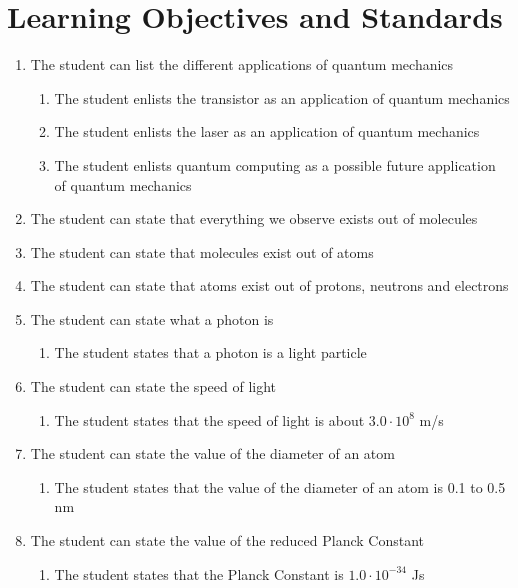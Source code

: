 \documentclass[11pt,twoside]{report} %
\begin{document}
\newpage

\chapter{Learning Objectives and Standards}
\label{app:objectivestandards}

\begin{enumerate}
\item The student can list the different applications of quantum mechanics
\begin{enumerate}
\item The student enlists the transistor as an application of quantum mechanics
\item The student enlists the laser as an application of quantum mechanics
\item The student enlists quantum computing as a possible future application of quantum mechanics
\end{enumerate}
\item \label{itm:molecules} The student can state that everything we observe exists out of molecules
\item The student can state that molecules exist out of atoms
\item The student can state that atoms exist out of protons, neutrons and electrons
\item The student can state what a photon is
\begin{enumerate}
\item The student states that a photon is a light particle
\end{enumerate}
\item The student can state the speed of light
\begin{enumerate}
\item The student states that the speed of light is about $3.0 \cdot 10 ^ 8$ m/s
\end{enumerate}
\item The student can state the value of the diameter of an atom
\begin{enumerate}
\item The student states that the value of the diameter of an atom is 0.1 to 0.5 nm
\end{enumerate}
\item \label{itm:planckconstant}The student can state the value of the reduced Planck Constant
\begin{enumerate}
\item The student states that the Planck Constant is $1.0 \cdot 10 ^ {-34}$ Js 

\end{enumerate}
\end{enumerate}
\end{document}
